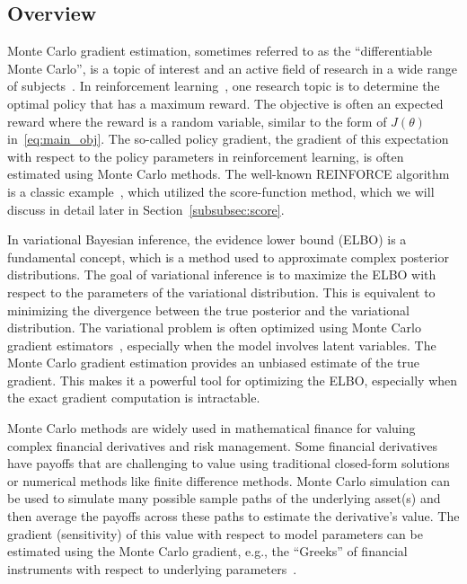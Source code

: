 \documentclass[12pt]{amsart}
\begin{document}
\subsection{Overview}

Monte Carlo gradient estimation, sometimes referred to as the ``differentiable Monte Carlo'', is a topic of interest and an active field of research in a wide range of subjects~\cite{mohamed2019monte}. In reinforcement learning~\cite{kaelbling1996reinforcement}, one research topic is to determine the optimal policy that has a maximum reward. The objective is often an expected reward where the reward is a random variable, similar to the form of $J(\theta)$ in~\eqref{eq:main_obj}. The so-called policy gradient, the gradient of this expectation with respect to the policy parameters in reinforcement learning, is often estimated using Monte Carlo methods. The well-known REINFORCE algorithm is a classic example~\cite{williams1992simple}, which utilized the score-function method, which we will discuss in detail later in Section~\ref{subsubsec:score}.

In variational Bayesian inference, the evidence lower bound (ELBO) is a fundamental concept, which is a method used to approximate complex posterior distributions. The goal of variational inference is to maximize the ELBO with respect to the parameters of the variational distribution. This is equivalent to minimizing the divergence between the true posterior and the variational distribution. The variational problem is 
often optimized using Monte Carlo gradient estimators~\cite{kingma2013auto}, especially when the model involves latent variables. 
The Monte Carlo gradient estimation provides an unbiased estimate of the true gradient. This makes it a powerful tool for optimizing the ELBO, especially when the exact gradient computation is intractable.


Monte Carlo methods are widely used in mathematical finance for valuing complex financial derivatives and risk management. Some financial derivatives have payoffs that are challenging to value using traditional closed-form solutions or numerical methods like finite difference methods.
Monte Carlo simulation can be used to simulate many possible sample paths of the underlying asset(s) and then average the payoffs across these paths to estimate the derivative's value.
The gradient (sensitivity) of this value with respect to model parameters can be estimated using the Monte Carlo gradient, e.g., the ``Greeks'' of financial instruments with respect to underlying parameters~\cite[Sec.~7.2]{glasserman2013monte}.  
\end{document}
